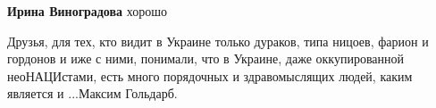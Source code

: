 \begin{itemize}
\begin{itemize} %
\textbf{Ирина Виноградова} хорошо


Друзья, для тех, кто видит в Украине только дураков, типа ницоев, фарион и
гордонов и иже с ними, понимали, что в Украине, даже оккупированной
неоНАЦИстами, есть много порядочных и здравомыслящих людей, каким является и
...Максим Гольдарб.

\end{itemize} %


\end{itemize} %
